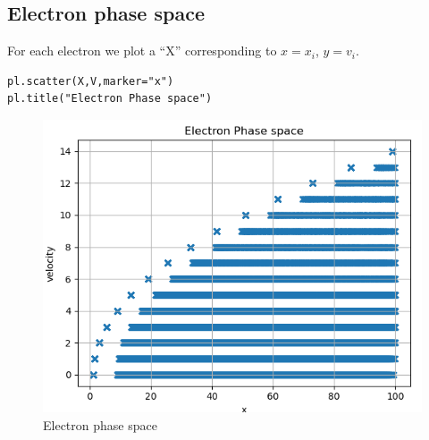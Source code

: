 \documentclass[11pt, a4paper]{article}
\begin{document}
\subsection{Electron phase space}
    For each electron we plot a “X” corresponding to $x = x_i$, $y = v_i$.
    \begin{verbatim}
pl.scatter(X,V,marker="x")
pl.title("Electron Phase space")
    \end{verbatim}
    \begin{figure}[!h]
        \centering
        \includegraphics[scale = 0.67]{Figure 3.png}
        \caption{Electron phase space}
        \label{fig:my_label}
    \end{figure}
\end{document}
